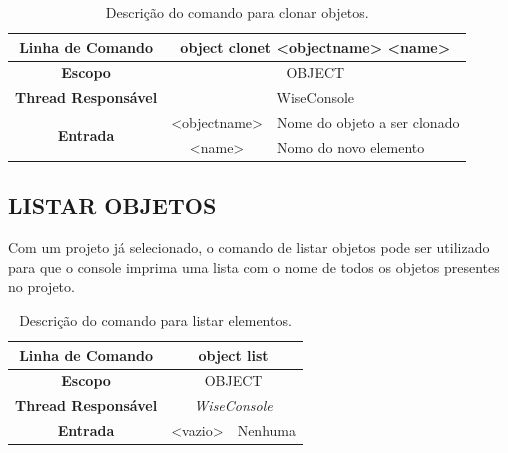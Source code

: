 \begin{center}
	\begin{table}[!htbp]
		\begin{tabularx}{\textwidth}{c|c|X}
			\toprule
			\textbf{Linha de Comando} & \multicolumn{2}{c}{object clonet <object\underline{\space\space}name> <name>} \\
			\midrule
			\textbf{Escopo} & \multicolumn{2}{c}{OBJECT} \\
			\hline
			\textbf{Thread Responsável} & \multicolumn{2}{c}{WiseConsole} \\
			\hline
			\multirow{2}{*}{\textbf{Entrada}} & <object\underline{\space\space}name> & Nome do objeto a ser clonado \\
			
			& <name> & Nomo do novo elemento \\
			\bottomrule
		\end{tabularx}
		\caption{Descrição do comando para clonar objetos.}
		\label{tab:clone_object}
	\end{table}
\end{center}

\subsection{LISTAR OBJETOS}\label{sec:list_object}

Com um projeto já selecionado, o comando de listar objetos pode ser utilizado para que o console imprima uma lista com o nome de todos os objetos presentes no projeto.

\begin{center}
	\begin{table}[!htbp]
		\begin{tabularx}{\textwidth}{c|c|X}
			\toprule
			\textbf{Linha de Comando} & \multicolumn{2}{c}{object list} \\
			\midrule
			\textbf{Escopo} & \multicolumn{2}{c}{OBJECT} \\
			\hline
			\textbf{Thread Responsável} & \multicolumn{2}{c}{\textit{WiseConsole}} \\
			\hline
			\textbf{Entrada} & <vazio> & Nenhuma \\
			\bottomrule
		\end{tabularx}
		\caption{Descrição do comando para listar elementos.}
		\label{tab:list_object}
	\end{table}
\end{center}

